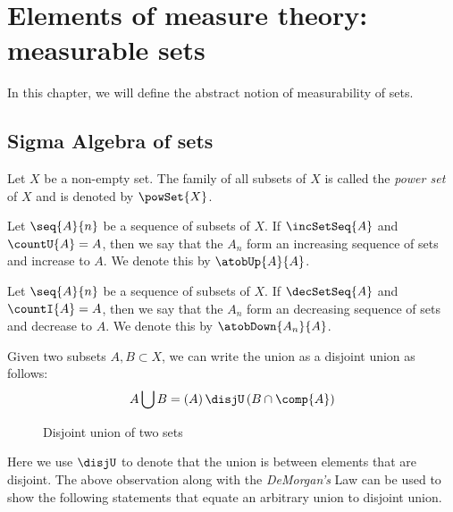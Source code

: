\chapter{Elements of measure theory: measurable sets}
In this chapter, we will define the abstract notion of measurability of sets.
\section{Sigma Algebra of sets}
\begin{Definition}[name=Power set]
    Let $X$ be a non-empty set. The family of all subsets of $X$ is called the \emph{power set} of $X$
    and is denoted by $\powSet{X}$.
\end{Definition}

\begin{Definition}[name=Increasing sequence of sets]
    Let $\seq{A}{n}$ be a sequence of subsets of $X$. If $\incSetSeq{A}$ and $\countU{A} = A$, then
    we say that the $A_n$ form an increasing sequence of sets and increase to $A$. We denote this by
    $\atobUp{A}{A}$.
\end{Definition}

\begin{Definition}[name=Decreasing sequence of sets]
    Let $\seq{A}{n}$ be a sequence of subsets of $X$. If $\decSetSeq{A}$ and $\countI{A} = A$, then
    we say that the $A_n$ form an decreasing sequence of sets and decrease to $A$. We denote this by
    $\atobDown{A_n}{A}$.
\end{Definition}

Given two subsets $A,B \subset X$, we can write the union as a disjoint union as follows:
\begin{equation*}
    A \bigcup B = \left(A\right) \disjU \left(B \cap \comp{A}\right)
\end{equation*}
\begin{figure}
  
  \caption{Disjoint union of two sets}\label{fig:tikz:disjU}
\end{figure}
Here we use $\disjU$ to denote that the union is between elements that are disjoint. 
The above observation along with the \emph{DeMorgan's} Law can be used to show the following
statements that equate an arbitrary union to disjoint union.

